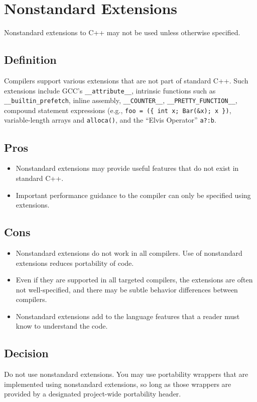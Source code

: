 
\section{Nonstandard Extensions}\label{sec:nonstandard-extensions}
Nonstandard extensions to C++ may not be used unless otherwise specified.

\subsection{Definition}
Compilers support various extensions that are not part of standard C++. Such extensions include GCC's \texttt{__attribute__}, intrinsic functions such as \texttt{__builtin_prefetch}, inline assembly, \texttt{__COUNTER__}, \texttt{__PRETTY_FUNCTION__}, compound statement expressions (e.g., \texttt{foo = (\{ int x; Bar(\&x); x \})}, variable-length arrays and \texttt{alloca()}, and the \enquote{Elvis Operator} \texttt{a?:b}.

\subsection{Pros}
\begin{itemize}
\item Nonstandard extensions may provide useful features that do not exist in standard C++.
\item Important performance guidance to the compiler can only be specified using extensions.
\end{itemize}

\subsection{Cons}
\begin{itemize}
\item Nonstandard extensions do not work in all compilers. Use of nonstandard extensions reduces portability of code.
\item Even if they are supported in all targeted compilers, the extensions are often not well-specified, and there may be subtle behavior differences between compilers.
\item Nonstandard extensions add to the language features that a reader must know to understand the code.
\end{itemize}

\subsection{Decision}
Do not use nonstandard extensions. You may use portability wrappers that are implemented using nonstandard extensions, so long as those wrappers are provided by a designated project-wide portability header.
